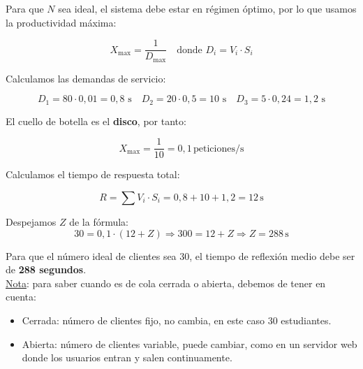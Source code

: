 \documentclass[a4paper,12pt]{article}
\begin{document}
Para que $N$ sea ideal, el sistema debe estar en régimen óptimo, por lo que usamos la productividad máxima:

\[
X_{\text{max}} = \frac{1}{D_{\text{max}}}
\quad \text{donde } D_i = V_i \cdot S_i
\]

Calculamos las demandas de servicio:

\[
D_1 = 80 \cdot 0{,}01 = 0{,}8 \text{ s} \quad
D_2 = 20 \cdot 0{,}5 = 10 \text{ s} \quad
D_3 = 5 \cdot 0{,}24 = 1{,}2 \text{ s}
\]

El cuello de botella es el \textbf{disco}, por tanto:

\[
X_{\text{max}} = \frac{1}{10} = 0{,}1 \, \text{peticiones/s}
\]

Calculamos el tiempo de respuesta total:

\[
R = \sum V_i \cdot S_i = 0{,}8 + 10 + 1{,}2 = 12 \, \text{s}
\]

Despejamos $Z$ de la fórmula:
\[
30 = 0{,}1 \cdot (12 + Z) \Rightarrow
300 = 12 + Z \Rightarrow
Z = \boxed{288 \, \text{s}}
\]

Para que el número ideal de clientes sea 30, el tiempo de reflexión medio debe ser de \textbf{288 segundos}. \\

\underline{Nota}: para saber cuando es de cola cerrada o abierta, debemos de tener en cuenta:
\begin{itemize}
    \item Cerrada: número de clientes fijo, no cambia, en este caso 30 estudiantes.
    \item Abierta: número de clientes variable, puede cambiar, como en un servidor web donde los usuarios entran y salen continuamente.
\end{itemize}
\end{document}
